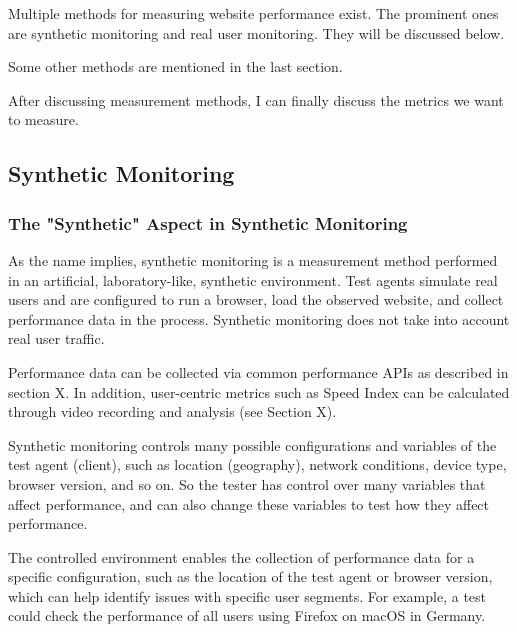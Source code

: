 
Multiple methods for measuring website performance exist.
The prominent ones are synthetic monitoring and real user monitoring.
They will be discussed below.

Some other methods are mentioned in the last section.

After discussing measurement methods, I can finally discuss the metrics we want to measure.






\subsection{Synthetic Monitoring}
\label{subsection:synthetic_monitoring}


\subsubsection{The "Synthetic" Aspect in Synthetic Monitoring} %

As the name implies, synthetic monitoring is a measurement method performed in an artificial, laboratory-like, synthetic environment.
Test agents simulate real users and are configured to run a browser, load the observed website, and collect performance data in the process.
Synthetic monitoring does not take into account real user traffic. %

Performance data can be collected via common performance APIs as described in section X.
In addition, user-centric metrics such as Speed Index can be calculated through video recording and analysis (see Section X). %

Synthetic monitoring controls many possible configurations and variables of the test agent (client), such as location (geography), network conditions, device type, browser version, and so on. %
So the tester has control over many variables that affect performance, and can also change these variables to test how they affect performance.

The controlled environment enables the collection of performance data for a specific configuration, such as the location of the test agent or browser version, which can help identify issues with specific user segments.
For example, a test could check the performance of all users using Firefox on macOS in Germany. %

